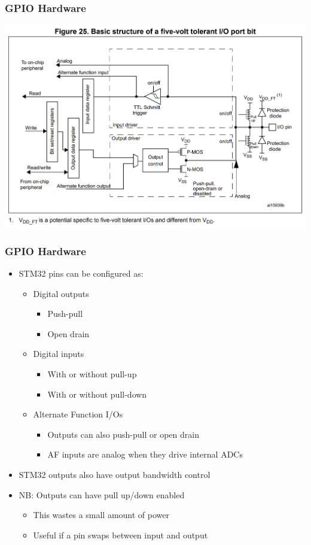 \documentclass[14pt]{beamer}
\begin{document}
\begin{frame}[fragile]
\frametitle{GPIO Hardware}
\begin{center}
\includegraphics[width=0.9\framewidth]{gpio}
\end{center}
\end{frame}

\begin{frame}[fragile]
\frametitle{GPIO Hardware}
\begin{itemize}
\item STM32 pins can be configured as:
	\begin{itemize}
		\item Digital outputs
			\begin{itemize}
				\item Push-pull
				\item Open drain
			\end{itemize}
		\item Digital inputs
			\begin{itemize}
				\item With or without pull-up
				\item With or without pull-down
			\end{itemize}
		\item Alternate Function I/Os
			\begin{itemize}
				\item Outputs can also push-pull or open drain
				\item AF inputs are analog when they drive internal ADCs
			\end{itemize}
	\end{itemize}
\item STM32 outputs also have output bandwidth control
\item NB: Outputs can have pull up/down enabled
	\begin{itemize}
		\item This wastes a small amount of power
		\item Useful if a pin swaps between input and output
	\end{itemize}
\end{itemize}
\end{frame}
\end{document}
